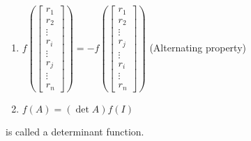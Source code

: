 \documentclass[11pt]{article}
\begin{document}
\begin{theorem}
\begin{definition}
\begin{enumerate}
        \item $f\left(\begin{bmatrix}
            r_1 \\ r_2 \\ \vdots \\ r_i \\ \vdots \\ r_j \\ \vdots \\ r_n
        \end{bmatrix}\right) = -f\left(\begin{bmatrix}
            r_1 \\ r_2 \\ \vdots \\ r_j \\ \vdots \\ r_i \\ \vdots \\ r_n
        \end{bmatrix}\right)$ (Alternating property)
        
        \item $f(A) = (\det A )f(I)$
    \end{enumerate}
    is called a determinant function.
\end{definition}
\end{theorem}
\end{document}
